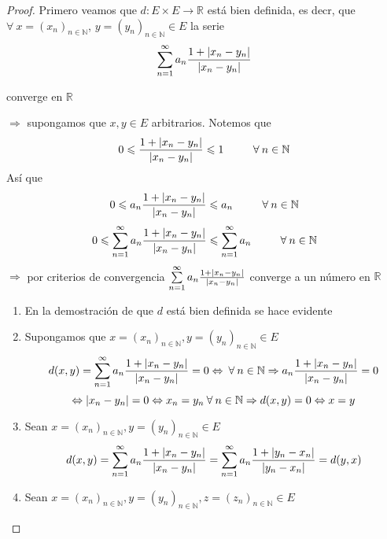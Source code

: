 \documentclass[12pt]{article}
\newcommand{\subscript}[2]{$#1 _ #2$}
\newcommand\N{\ensuremath{\mathbb{N}}}
\newcommand\R{\ensuremath{\mathbb{R}}}
\begin{document}
\begin{enumerate}[label=\textbf{\arabic*}.]
\begin{proof}
    Primero veamos que $d : E \times E \to \R$ está bien definida, es decr, que $\forall \: x = {(x_n)}_{n \in \N} $, $  y = {(y_n)}_{n \in \N} \in E$ la serie 
    \begin{equation*}
        \sum_{n=1}^{\infty} a_n \frac{1+ \abs{x_n-y_n}}{\abs{x_n-y_n}}
    \end{equation*}

    converge en $\R$

    $\Rightarrow$ supongamos que $x, y \in E$ arbitrarios. Notemos que 
    \begin{equation*}
        0 \leqslant \frac{1+ \abs{x_n-y_n}}{\abs{x_n-y_n}} \leqslant 1 \: \: \: \: \: \: \: \: \: \: \: \: \forall \: n \in \N
    \end{equation*}
    Así que 
    \begin{equation*}
        0 \leqslant a_n \frac{1+ \abs{x_n-y_n}}{\abs{x_n-y_n}} \leqslant a_n \: \: \: \: \: \: \: \: \: \: \: \: \forall \: n \in \N
    \end{equation*}
    \begin{equation*}
        0 \leqslant  \sum_{n=1}^{\infty} a_n \frac{1+ \abs{x_n-y_n}}{\abs{x_n-y_n}} \leqslant  \sum_{n=1}^{\infty} a_n \: \: \: \: \: \: \: \: \: \: \: \: \forall \: n \in \N
    \end{equation*}
    $\Rightarrow$ por criterios de convergencia $\sum\limits_{n=1}^{\infty} a_n \frac{1+ \abs{x_n-y_n}}{\abs{x_n-y_n}}$ converge a un número en $\R$
\begin{enumerate}[label=(\subscript{D}{{\arabic*}})]
\item En la demostración de que $d$ está bien definida se hace evidente
\item Supongamos que $x ={(x_n)}_{n \in \N}, y ={(y_n)}_{n \in \N} \in E$
\begin{equation*}
    d(x,y) = \sum_{n=1}^{\infty} a_n \frac{1+ \abs{x_n-y_n}}{\abs{x_n-y_n}} = 0 \Leftrightarrow \: \forall \: n \in \N \Rightarrow a_n \frac{1+ \abs{x_n-y_n}}{\abs{x_n-y_n}} = 0
\end{equation*}
\begin{equation*}
    \Leftrightarrow \abs{x_n-y_n} = 0 \Leftrightarrow x_n = y_n \: \forall \: n \in \N \Rightarrow d(x,y) = 0 \Leftrightarrow x = y
\end{equation*}
\item Sean  $x ={(x_n)}_{n \in \N}, y ={(y_n)}_{n \in \N} \in E$
\begin{equation*}
    d(x,y) = \sum_{n=1}^{\infty} a_n \frac{1+ \abs{x_n-y_n}}{\abs{x_n-y_n}} =  \sum_{n=1}^{\infty} a_n \frac{1+ \abs{y_n-x_n}}{\abs{y_n-x_n}} = d(y,x)
\end{equation*}
\item Sean  $x ={(x_n)}_{n \in \N}, y ={(y_n)}_{n \in \N}, z ={(z_n)}_{n \in \N} \in E$


\end{enumerate}
\end{proof}
\end{enumerate}
\end{document}
